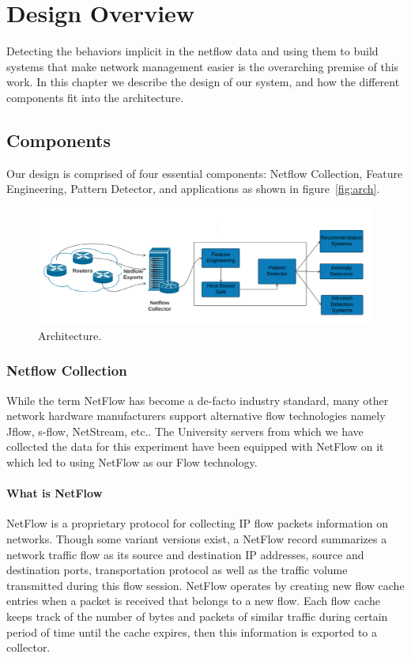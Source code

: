 
\chapter{Design Overview}

Detecting the behaviors implicit in the netflow data and
using them to build systems that make network management
easier is the overarching premise of this work. In this chapter we describe the design of our system, and how the
different components fit into the architecture.

\section{Components}

Our design is comprised of four essential components: Netflow Collection, Feature Engineering, Pattern Detector, and
applications as shown in figure~\ref{fig:arch}.

\begin{figure}[ht]
	\centerline{\includegraphics[scale = 0.4]{architecture.png}}
	\caption{Architecture.}%
\end{figure}

\subsection{Netflow Collection}
While the term NetFlow has become a de-facto industry standard, many other network hardware manufacturers support alternative flow technologies namely Jflow, s-flow, NetStream, etc.. The University servers from which we have collected the data for this experiment have been equipped with NetFlow on it which led to using NetFlow as our Flow technology. 
\subsubsection*{What is NetFlow}
NetFlow is a proprietary protocol for collecting IP flow packets information on networks. Though some variant versions exist, a NetFlow record summarizes a network traffic flow as its source and destination IP addresses, source and destination ports, transportation protocol as well as the traffic volume transmitted during this flow session. NetFlow operates by creating new flow cache entries when a packet is received that belongs to a new flow. Each flow cache keeps track of the number of bytes and packets of similar traffic during certain period of time until the cache expires, then this information is exported to a collector. 

